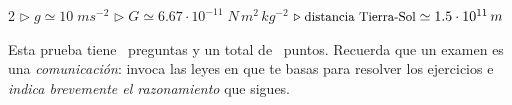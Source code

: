 \documentclass[a4paper,addpoints,14pt]{exam}
\begin{document}


\begin{learn}
\begin{multicols}{2}
{$\triangleright\; g\simeq 10\;ms^{-2}$\newline
$\triangleright\; G\simeq 6.67\cdot 10^{-11}\;N\,m^2\,kg^{-2}$\newline
$\triangleright\; {\small\text{distancia Tierra-Sol}}\simeq 1.5\cdot 10^{11}\,m$
}
\end{multicols}
\end{learn}	

\vspace{1ex}

\begin{problemas}{Esta prueba tiene \numquestions\ preguntas y un total de 
\numpoints\  puntos. Recuerda que un examen es una \textit{comunicación}: invoca las leyes en que te basas para resolver los ejercicios e \textit{indica brevemente el razonamiento} que sigues.}
\end{problemas}
\vspace*{\fill}

\boxedpoints
\end{document}
